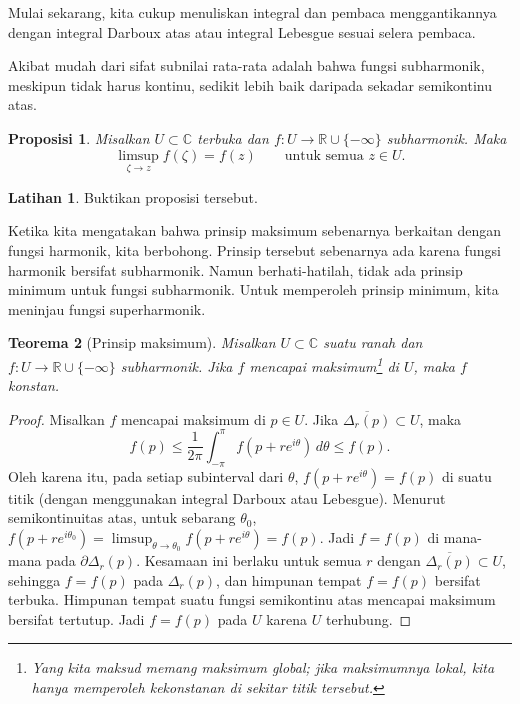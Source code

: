 \documentclass[12pt,openany]{book}
\newcommand{\C}{{\mathbb{C}}}
\newcommand{\R}{{\mathbb{R}}}
\theoremstyle{plain}
\newtheorem{thm}{Teorema}[section]
\newtheorem{prop}[thm]{Proposisi}
\theoremstyle{remark}
\theoremstyle{definition}
\newenvironment{exbox}{%
    \def\FrameCommand{\vrule width 1pt \relax\hspace{10pt}}%
    \MakeFramed{\advance\hsize-\width\FrameRestore}%
}{%
    \endMakeFramed
}
\theoremstyle{exercise}
\newtheorem{exercise}{Latihan}[section]
\theoremstyle{example}
\begin{document}
Mulai sekarang, kita cukup menuliskan integral dan
pembaca menggantikannya dengan integral Darboux atas atau integral Lebesgue
sesuai selera pembaca.

Akibat mudah dari sifat subnilai rata-rata adalah bahwa fungsi
subharmonik, meskipun tidak harus kontinu, sedikit lebih baik daripada sekadar
semikontinu atas.

\begin{prop}
Misalkan $U \subset \C$ terbuka dan
$f \colon U \to \R \cup\{- \infty \}$ subharmonik.
Maka 
\begin{equation*}
\limsup_{\zeta \to z} f(\zeta) = f(z) 
\qquad \text{untuk semua $z \in U$.}
\end{equation*}
\end{prop}

\begin{exbox}
\begin{exercise}
Buktikan proposisi tersebut.
\end{exercise}
\end{exbox}

Ketika kita mengatakan bahwa prinsip maksimum sebenarnya berkaitan dengan fungsi
harmonik, kita berbohong.  Prinsip tersebut sebenarnya ada karena fungsi harmonik bersifat
subharmonik.  Namun berhati-hatilah, tidak ada prinsip minimum untuk
fungsi subharmonik.  Untuk memperoleh prinsip minimum, kita meninjau fungsi
superharmonik.

\begin{thm}[Prinsip maksimum]
Misalkan $U \subset \C$ suatu ranah dan $f \colon U \to \R \cup \{ -\infty \}$
subharmonik.  Jika $f$ mencapai maksimum\footnote{%
Yang kita maksud memang maksimum global; jika maksimumnya lokal, kita hanya
memperoleh kekonstanan di sekitar titik tersebut.}
di $U$, maka $f$ konstan.
\end{thm}

\begin{proof}
Misalkan $f$ mencapai maksimum di $p \in U$.
Jika
$\overline{\Delta_r(p)} \subset U$, maka
\begin{equation*}
f(p) \leq \frac{1}{2\pi} \int_{-\pi}^{\pi} f(p+re^{i\theta})\, d\theta \leq f(p)
.
\end{equation*}
Oleh karena itu, pada setiap subinterval dari $\theta$, $f(p+re^{i\theta}) = f(p)$
di suatu titik (dengan menggunakan integral Darboux atau Lebesgue).
Menurut semikontinuitas atas, untuk sebarang $\theta_0$,
$f(p+re^{i\theta_0}) = \limsup_{\theta \to \theta_0} f(p+re^{i\theta}) =
f(p)$.  Jadi $f = f(p)$ di mana-mana pada $\partial \Delta_r(p)$.
Kesamaan ini berlaku untuk semua $r$
dengan $\overline{\Delta_r(p)} \subset U$, sehingga $f=f(p)$ pada $\Delta_r(p)$,
dan himpunan tempat $f=f(p)$ bersifat terbuka.  Himpunan tempat suatu fungsi semikontinu atas
mencapai maksimum bersifat tertutup.  Jadi $f=f(p)$ pada $U$ karena $U$
terhubung.
\end{proof}
\end{document}

